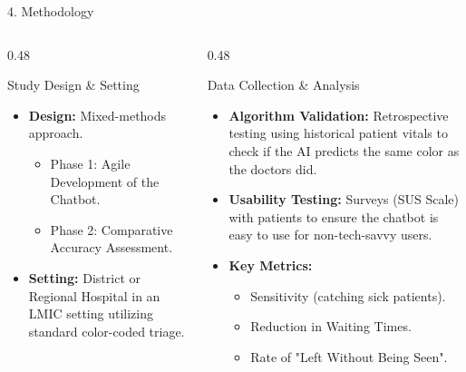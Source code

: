 \documentclass[aspectratio=169]{beamer}
\begin{document}
	\begin{frame}{4. Methodology}
		\begin{columns}[t]
			\begin{column}{0.48\textwidth}
				\begin{block}{Study Design \& Setting}
					\begin{itemize}
						\item \textbf{Design:} Mixed-methods approach.
						\begin{itemize} \footnotesize
							\item Phase 1: Agile Development of the Chatbot.
							\item Phase 2: Comparative Accuracy Assessment.
						\end{itemize}
						\item \textbf{Setting:} District or Regional Hospital in an LMIC setting utilizing standard color-coded triage.
					\end{itemize}
				\end{block}
			\end{column}
			
			\begin{column}{0.48\textwidth}
				\begin{block}{Data Collection \& Analysis}
					\begin{itemize}
						\item \textbf{Algorithm Validation:} Retrospective testing using historical patient vitals to check if the AI predicts the same color as the doctors did.
						\item \textbf{Usability Testing:} Surveys (SUS Scale) with patients to ensure the chatbot is easy to use for non-tech-savvy users.
						\item \textbf{Key Metrics:}
						\begin{itemize} \footnotesize
							\item Sensitivity (catching sick patients).
							\item Reduction in Waiting Times.
							\item Rate of "Left Without Being Seen".
						\end{itemize}
					\end{itemize}
				\end{block}
			\end{column}
		\end{columns}
	\end{frame}
	
\end{document}
